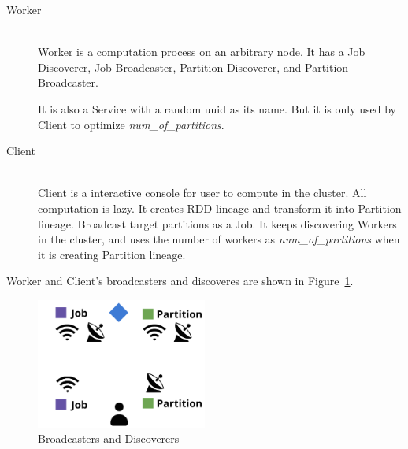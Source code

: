 \begin{description}
    \item[Worker] \hfill \\
    Worker is a computation process on an arbitrary node.
    It has a Job Discoverer, Job Broadcaster, Partition Discoverer, and Partition Broadcaster.

    It is also a Service with a random uuid as its name.
    But it is only used by Client to optimize \emph{num\_of\_partitions}.

    \item[Client] \hfill \\
    Client is a interactive console for user to compute in the cluster.
    All computation is lazy.
    It creates RDD lineage and transform it into Partition lineage.
    Broadcast target partitions as a Job.
    It keeps discovering Workers in the cluster, and uses the number of workers as \emph{num\_of\_partitions} when it is creating Partition lineage.
\end{description}

Worker and Client's broadcasters and discoveres are shown in Figure~\ref{fig:broadcaster}.

\begin{figure}[htb]
    \centering
    \includegraphics[width=0.5\textwidth]{images/broadcaster.png}
    \caption{Broadcasters and Discoverers}\label{fig:broadcaster}
\end{figure}

